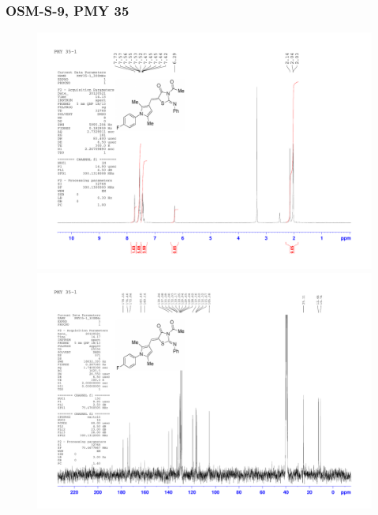 \documentclass[12pt, a4paper,titlepage]{article}
\begin{document}
{\subsubsection*{OSM-S-9, PMY 35}
\label{spec:PMY35}
	\begin{figure}[H] 
	\begin{center}
	\includegraphics[width=14.5cm]{expdata/PMY35/1H}
	\includegraphics[width=14.5cm]{expdata/PMY35/13C}
	\end{center}
	\end{figure}

}
\end{document}
